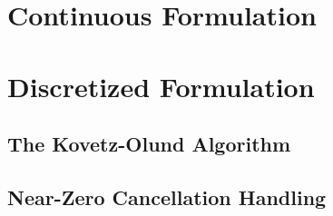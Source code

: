\section{Continuous Formulation}
\section{Discretized Formulation}
    \subsection{The Kovetz-Olund Algorithm}
    \subsection{Near-Zero Cancellation Handling}
